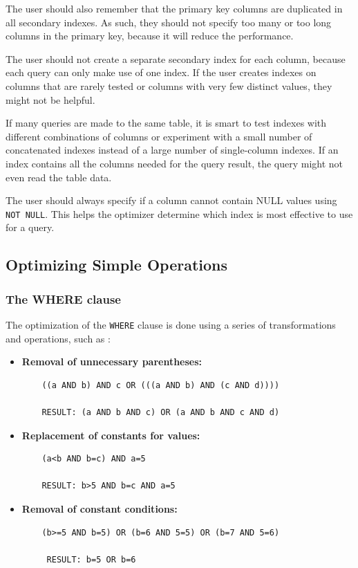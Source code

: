 \documentclass[12pt]{article}
\begin{document}
The user should also remember that the primary key columns are duplicated in all secondary indexes. As such, they should not specify too many or too long columns in the primary key, because it will reduce the performance.

The user should not create a separate secondary index for each column, because each query can only make use of one index. If the user creates indexes on columns that are rarely tested or columns with very few distinct values, they might not be helpful.

If many queries are made to the same table, it is smart to test indexes with different combinations of columns or experiment with a small number of concatenated indexes instead of a large number of single-column indexes. If an index contains all the columns needed for the query result, the query might not even read the table data.

The user should always specify if a column cannot contain NULL values using \verb|NOT NULL|. This helps the optimizer determine which index is most effective to use for a query.


\subsection{Optimizing Simple Operations}
\label{simpleOperations}


\subsubsection{The WHERE clause}
\label{whereClause}
The optimization of the \verb|WHERE| clause is done using a series of transformations and operations, such as \parencite{WHEREClauseOptimization}:
\begin{itemize}
    \item \textbf{Removal of unnecessary parentheses:}
    \begin{verbatim}
    ((a AND b) AND c OR (((a AND b) AND (c AND d))))
    
    RESULT: (a AND b AND c) OR (a AND b AND c AND d)
    \end{verbatim}
    
    \item \textbf{Replacement of constants for values:}
    \begin{verbatim}
    (a<b AND b=c) AND a=5
    
    RESULT: b>5 AND b=c AND a=5
    \end{verbatim}
    
    \item \textbf{Removal of constant conditions:}
    \begin{verbatim}
    (b>=5 AND b=5) OR (b=6 AND 5=5) OR (b=7 AND 5=6) 

     RESULT: b=5 OR b=6
    \end{verbatim}

\end{itemize}
\end{document}
